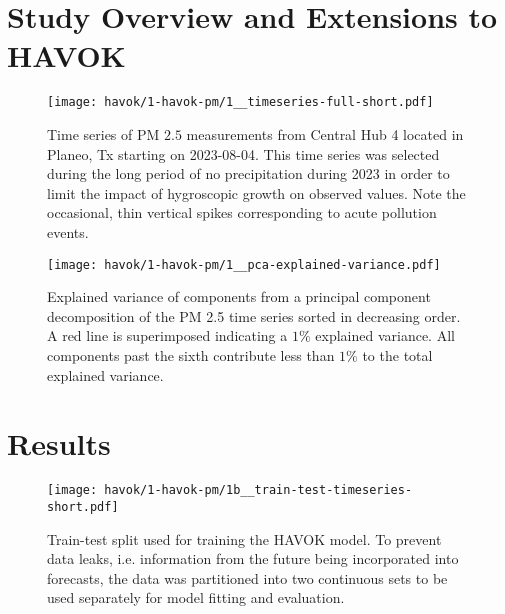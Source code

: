 \section{Study Overview and Extensions to HAVOK}



\begin{figure}[h]
  \centering
  \texttt{[image: havok/1-havok-pm/1\_\_timeseries-full-short.pdf]}
  \caption{Time series of PM $2.5$ measurements from Central Hub 4 located in
    Planeo, Tx starting on 2023-08-04. This time series was selected during the
    long period of no precipitation during 2023 in order to limit the impact of
    hygroscopic growth on observed values. Note the occasional, thin vertical
    spikes corresponding to acute pollution events.}
  \label{fig:pm-timeseries-orig}
\end{figure}


\begin{figure}[h]
  \centering
  \texttt{[image: havok/1-havok-pm/1\_\_pca-explained-variance.pdf]}
  \caption{Explained variance of components from a principal component
    decomposition of the PM 2.5 time series sorted in decreasing order. A red
    line is superimposed indicating a $1\%$ explained variance. All components
    past the sixth contribute less than $1\%$ to the total explained variance. }
  \label{fig:pm-timeseries-pca}
\end{figure}


\section{Results}


\begin{figure}[h]
  \centering
  \texttt{[image: havok/1-havok-pm/1b\_\_train-test-timeseries-short.pdf]}
  \caption{Train-test split used for training the HAVOK model. To prevent data
    leaks, i.e. information from the future being incorporated into forecasts,
    the data was partitioned into two continuous sets to be used separately for
    model fitting and evaluation.}
  \label{fig:pm-train-test-split}
\end{figure}



